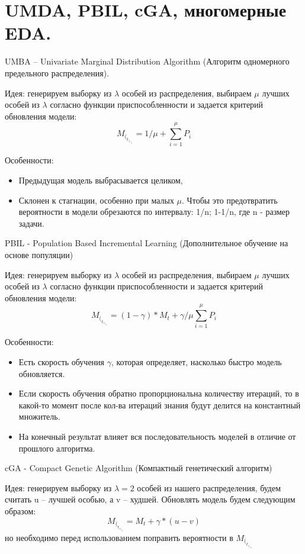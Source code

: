\section{UMDA, PBIL, cGA, многомерные EDA.}

UMBA – Univariate Marginal Distribution Algorithm (Алгоритм одномерного предельного распределения).

Идея: генерируем выборку из $\lambda$ особей из распределения, выбираем $\mu$ лучших особей из $\lambda$ согласно функции приспособленности и задается критерий обновления модели: $$M_(_t_+_1_) =  1/\mu + \sum_{i=1}^{\mu} P_i $$

Особенности: 

\begin{itemize}
      \item Предыдущая модель выбрасывается целиком, 
      \item Склонен к стагнации, особенно при малых $\mu$. Чтобы это предотвратить вероятности в модели обрезаются по интервалу: 1/n; 1-1/n, где  n -  размер задачи.
   \end{itemize}

PBIL - Population Based Incremental Learning (Дополнительное обучение на основе популяции)

Идея: генерируем выборку из $\lambda$ особей из распределения, выбираем $\mu$ лучших особей из $\lambda$ согласно функции приспособленности и задается критерий обновления модели: $$M_(_t_+_1_) =  (1 - \gamma)*M_t +\gamma/\mu\sum_{i=1}^{\mu} P_i $$

Особенности:
\begin{itemize}
      \item Есть скорость обучения $\gamma$, которая определяет, насколько быстро модель обновляется.
      \item Если скорость обучения обратно пропорциональна количеству итераций, то в какой-то момент после кол-ва итераций знания будут делится на константный множитель.
      \item На конечный результат влияет вся последовательность моделей в отличие от прошлого алгоритма.
   \end{itemize}



cGA - Compact Genetic Algorithm (Компактный генетический алгоритм)

Идея: генерируем выборку из $\lambda=2$ особей из нашего распределения, будем считать u – лучшей особью, а v – худшей. Обновлять модель будем следующим образом:  $$M_(_t_+_1_) = M_t +\gamma*(u-v) $$ но необходимо перед использованием поправить вероятности в $M_(_t_+_1_)$

